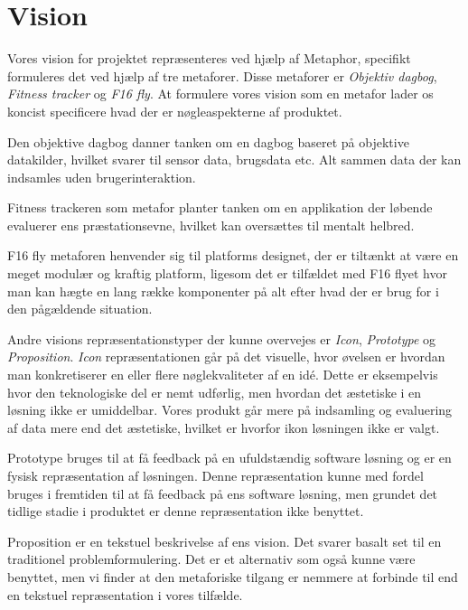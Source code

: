\section{Vision}
Vores vision for projektet repræsenteres ved hjælp af Metaphor, specifikt formuleres det ved hjælp af tre metaforer.
Disse metaforer er \textit{Objektiv dagbog}, \textit{Fitness tracker} og \textit{F16 fly}.
At formulere vores vision som en metafor lader os koncist specificere hvad der er nøgleaspekterne af produktet.

Den objektive dagbog danner tanken om en dagbog baseret på objektive datakilder, hvilket svarer til sensor data, brugsdata etc.
Alt sammen data der kan indsamles uden brugerinteraktion.

Fitness trackeren som metafor planter tanken om en applikation der løbende evaluerer ens præstationsevne, hvilket kan oversættes til mentalt helbred.

F16 fly metaforen henvender sig til platforms designet, der er tiltænkt at være en meget modulær og kraftig platform, ligesom det er tilfældet med F16 flyet hvor man kan hægte en lang række komponenter på alt efter hvad der er brug for i den pågældende situation.

Andre visions repræsentationstyper der kunne overvejes er \textit{Icon}, \textit{Prototype} og \textit{Proposition}.
\textit{Icon} repræsentationen går på det visuelle, hvor øvelsen er hvordan man konkretiserer en eller flere nøglekvaliteter af en idé.
Dette er eksempelvis hvor den teknologiske del er nemt udførlig, men hvordan det æstetiske i en løsning ikke er umiddelbar.
Vores produkt går mere på indsamling og evaluering af data mere end det æstetiske, hvilket er hvorfor ikon løsningen ikke er valgt.

Prototype bruges til at få feedback på en ufuldstændig software løsning og er en fysisk repræsentation af løsningen.
Denne repræsentation kunne med fordel bruges i fremtiden til at få feedback på ens software løsning, men grundet det tidlige stadie i produktet er denne repræsentation ikke benyttet.

Proposition er en tekstuel beskrivelse af ens vision. Det svarer basalt set til en traditionel problemformulering.
Det er et alternativ som også kunne være benyttet, men vi finder at den metaforiske tilgang er nemmere at forbinde til end en tekstuel repræsentation i vores tilfælde.